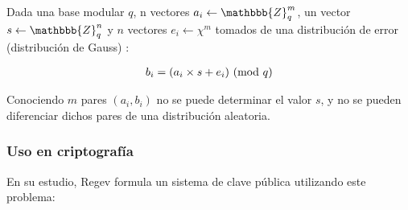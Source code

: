 Dada una base modular $q$, n vectores $a_i \leftarrow \mathbbb{Z}^m_q$, un vector $s \leftarrow \mathbbb{Z}^n_q$ y $n$ vectores $ e_i \leftarrow \chi{}^m $ tomados de una distribución de error (distribución de Gauss\cite{wikipedia_contributors._generalized_2019}) \chi{} \subset{} :

\begin{gather}
    \label{form:gen_lwe}
    b_i = (a_i \times s + e_i) \ (\mathrm{mod}\ q)
\end{gather}

Conociendo $m$ pares $(a_i, b_i)$ no se puede determinar el valor $s$, y no se pueden diferenciar dichos pares de una distribución aleatoria\cite{t._zijlstra_learning_nodate}.

\subsubsection{Uso en criptografía}

En su estudio, Regev\cite{regev_learning_2010} formula un sistema de clave pública utilizando este problema:

